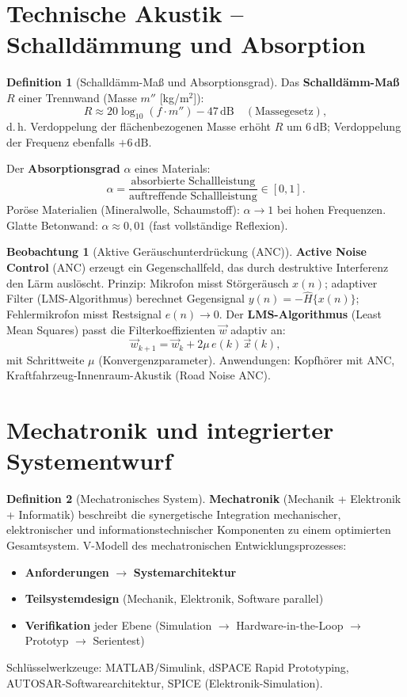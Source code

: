 ﻿\documentclass[a4paper,12pt]{report}
\theoremstyle{definition}
\newtheorem{definition}{Definition}
\newtheorem{beobachtung}{Beobachtung}
\begin{document}
\section{Technische Akustik -- Schalldämmung und Absorption}

\begin{definition}[Schalldämm-Maß und Absorptionsgrad]
Das \textbf{Schalldämm-Maß} $R$ einer Trennwand (Masse $m''$ [kg/m$^2$]):
\[
  R \approx 20\log_{10}(f\cdot m'') - 47\,\mathrm{dB} \quad (\text{Massegesetz}),
\]
d.\,h. Verdoppelung der flächenbezogenen Masse erhöht $R$ um $6\,\mathrm{dB}$;
Verdoppelung der Frequenz ebenfalls $+6\,\mathrm{dB}$.

Der \textbf{Absorptionsgrad} $\alpha$ eines Materials:
\[
  \alpha = \frac{\text{absorbierte Schallleistung}}{\text{auftreffende Schallleistung}} \in [0,1].
\]
Poröse Materialien (Mineralwolle, Schaumstoff): $\alpha \to 1$ bei hohen Frequenzen.
Glatte Betonwand: $\alpha \approx 0{,}01$ (fast vollständige Reflexion).
\end{definition}

\begin{beobachtung}[Aktive Geräuschunterdrückung (ANC)]
\textbf{Active Noise Control} (ANC) erzeugt ein Gegenschallfeld,
das durch destruktive Interferenz den Lärm auslöscht.
Prinzip: Mikrofon misst Störgeräusch $x(n)$; adaptiver Filter
(LMS-Algorithmus) berechnet Gegensignal $y(n) = -\hat{H}\{x(n)\}$;
Fehlermikrofon misst Restsignal $e(n) \to 0$.
Der \textbf{LMS-Algorithmus} (Least Mean Squares) passt die Filterkoeffizienten
$\vec{w}$ adaptiv an:
\[
  \vec{w}_{k+1} = \vec{w}_k + 2\mu\,e(k)\,\vec{x}(k),
\]
mit Schrittweite $\mu$ (Konvergenzparameter).
Anwendungen: Kopfhörer mit ANC, Kraftfahrzeug-Innenraum-Akustik (Road Noise ANC).
\end{beobachtung}

\section{Mechatronik und integrierter Systementwurf}

\begin{definition}[Mechatronisches System]
\textbf{Mechatronik} (Mechanik + Elektronik + Informatik) beschreibt
die synergetische Integration mechanischer, elektronischer und
informationstechnischer Komponenten zu einem optimierten Gesamtsystem.
V-Modell des mechatronischen Entwicklungsprozesses:
\begin{itemize}
    \item[-] \textbf{Anforderungen} $\to$ \textbf{Systemarchitektur}
    \item[-] \textbf{Teilsystemdesign} (Mechanik, Elektronik, Software parallel)
    \item[-] \textbf{Verifikation} jeder Ebene (Simulation $\to$ Hardware-in-the-Loop $\to$ Prototyp $\to$ Serientest)
\end{itemize}
Schlüsselwerkzeuge: MATLAB/Simulink, dSPACE Rapid Prototyping,
AUTOSAR-Softwarearchitektur, SPICE (Elektronik-Simulation).
\end{definition}
\end{document}
